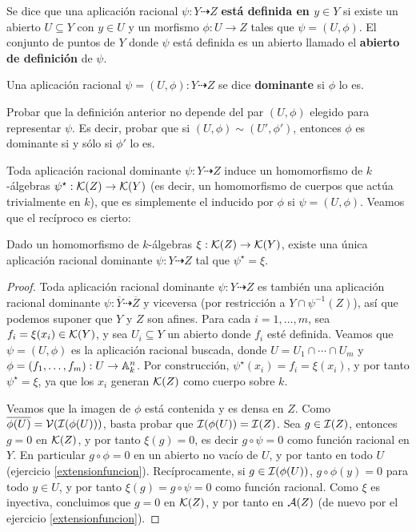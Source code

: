 \documentclass[ACGA.tex]{subfiles}
\begin{document}
\begin{defi}
 Se dice que una aplicación racional $\psi:Y\dashrightarrow Z$ {\bf está definida en $y\in Y$} si existe un abierto $U\subseteq Y$ con $y\in U$ y un morfismo $\phi:U\to Z$ tales que $\psi=(U,\phi)$. El conjunto de puntos de $Y$ donde $\psi$ está definida es un abierto llamado el {\bf abierto de definición} de $\psi$.
\end{defi}

\begin{defi}
 Una aplicación racional $\psi=(U,\phi):Y\dashrightarrow Z$ se dice {\bf dominante} si $\phi$ lo es.
\end{defi}

\begin{ejer}
 Probar que la definición anterior no depende del par $(U,\phi)$ elegido para representar $\psi$. Es decir, probar que si $(U,\phi)\sim(U',\phi')$, entonces $\phi$ es dominante si y sólo si $\phi'$ lo es.
\end{ejer}

Toda aplicación racional dominante $\psi:Y\dashrightarrow Z$ induce un homomorfismo de $k$-álgebras $\psi^\star:{\mathcal K}(Z)\to{\mathcal K}(Y)$ (es decir, un homomorfismo de cuerpos que actúa trivialmente en $k$), que es simplemente el inducido por $\phi$ si $\psi=(U,\phi)$. Veamos que el recíproco es cierto:

\begin{prop}\label{morfismoaracional}
 Dado un homomorfismo de $k$-álgebras $\xi:{\mathcal K}(Z)\to{\mathcal K}(Y)$, existe una única aplicación racional dominante $\psi:Y\dashrightarrow Z$ tal que $\psi^\star=\xi$.
\end{prop}

\begin{proof}
 Toda aplicación racional dominante $\psi:Y\dashrightarrow Z$ es también una aplicación racional dominante $\psi:\overline Y\dashrightarrow\overline Z$ y viceversa (por restricción a $Y\cap\psi^{-1}(Z)$), así que podemos suponer que $Y$ y $Z$ son afines. Para cada $i=1,\ldots,m$, sea $f_i=\xi(x_i)\in{\mathcal K}(Y)$, y sea $U_i\subseteq Y$ un abierto donde $f_i$ esté definida. Veamos que $\psi=(U,\phi)$ es la aplicación racional buscada, donde $U=U_1\cap\cdots\cap U_m$ y $\phi=(f_1,\ldots,f_m): U\to\mathbb{A}^n_k$. Por construcción, $\psi^\star(x_i)=f_i=\xi(x_i)$, y por tanto $\psi^\star=\xi$, ya que los $x_i$ generan ${\mathcal K}(Z)$ como cuerpo sobre $k$.

 Veamos que la imagen de $\phi$ está contenida y es densa en $Z$. Como $\overline{\phi(U)}=\mathcal{V}(\mathcal{I}(\phi(U)))$, basta probar que $\mathcal{I}(\phi(U))=\mathcal{I}(Z)$. Sea $g\in\mathcal{I}(Z)$, entonces $g=0$ en ${\mathcal K}(Z)$, y por tanto $\xi(g)=0$, es decir $g\circ\psi=0$ como función racional en $Y$. En particular $g\circ\phi=0$ en un abierto no vacío de $U$, y por tanto en todo $U$ (ejercicio \ref{extensionfuncion}). Recíprocamente, si $g\in\mathcal{I}(\phi(U))$, $g\circ\phi(y)=0$ para todo $y\in U$, y por tanto $\xi(g)=g\circ\psi=0$ como función racional. Como $\xi$ es inyectiva, concluimos que $g=0$ en ${\mathcal K}(Z)$, y por tanto en $\mathcal{A}(Z)$ (de nuevo por el ejercicio \ref{extensionfuncion}).
\end{proof}
\end{document}
